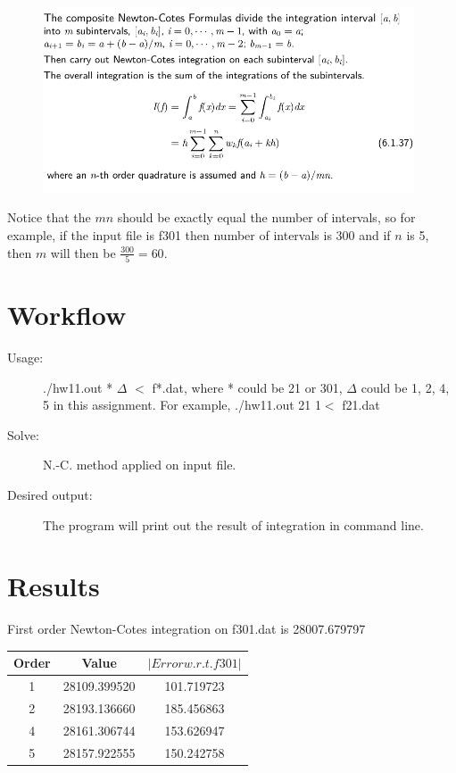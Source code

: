 \documentclass[12pt,a4paper]{article}
\begin{document}
\begin{figure}[h!]
  \centering
     \includegraphics[width=0.98\textwidth]{./nc.png}
 \end{figure}
 Notice that the $mn$ should be exactly equal the number of intervals, so for example, if the input file is f301 then number of intervals is 300 and if $n$ is 5, then $m$ will then be $\frac{300}{5}=60$.
 
\section{Workflow}
\begin{description}  

\item [Usage:] ./hw11.out  *  $\Delta$ $<$ f*.dat, where * could be 21 or 301, $\Delta$ could be 1, 2, 4, 5 in this assignment. For example,  ./hw11.out  21 1$<$ f21.dat
\item [Solve:] N.-C. method applied on input file.
\item[Desired output:] The program will print out the result of integration in command line.
\end{description}

\section{Results}

First order Newton-Cotes integration on f301.dat is 28007.679797

\begin{center}
    \begin{tabular}{|c|c|c|}
    \hline  Order & Value &  $|Error  w.r.t. f301|$   \\
    \hline  1	&28109.399520	&101.719723	\\
    \hline  2	&28193.136660	&185.456863	\\
    \hline  4	&28161.306744	&153.626947	\\
    \hline  5	&28157.922555	&150.242758	\\\hline
     \end{tabular}
 \end{center}
\end{document}
